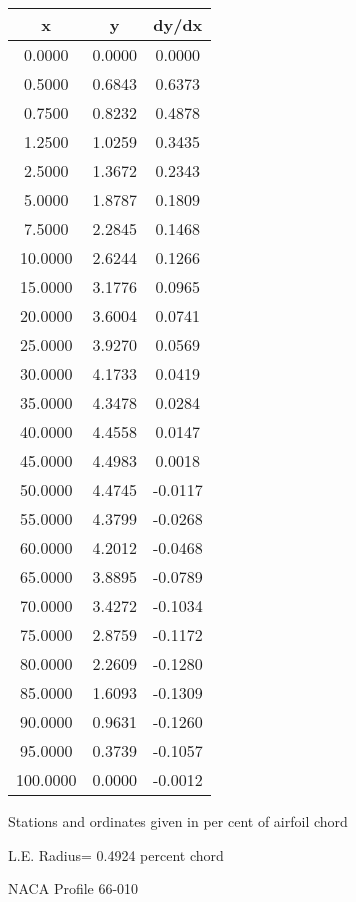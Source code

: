 \documentclass[11pt]{book}
\begin{document}
 \vspace{8mm}
 \begin{tabular}{|c|c|c|} \hline 
  x  &  y  &  dy/dx \\
 \hline
0.0000 & 0.0000 & 0.0000 \\
0.5000 & 0.6843 & 0.6373 \\
0.7500 & 0.8232 & 0.4878 \\
1.2500 & 1.0259 & 0.3435 \\
2.5000 & 1.3672 & 0.2343 \\
5.0000 & 1.8787 & 0.1809 \\
7.5000 & 2.2845 & 0.1468 \\
10.0000 & 2.6244 & 0.1266 \\
15.0000 & 3.1776 & 0.0965 \\
20.0000 & 3.6004 & 0.0741 \\
25.0000 & 3.9270 & 0.0569 \\
30.0000 & 4.1733 & 0.0419 \\
35.0000 & 4.3478 & 0.0284 \\
40.0000 & 4.4558 & 0.0147 \\
45.0000 & 4.4983 & 0.0018 \\
50.0000 & 4.4745 & -0.0117 \\
55.0000 & 4.3799 & -0.0268 \\
60.0000 & 4.2012 & -0.0468 \\
65.0000 & 3.8895 & -0.0789 \\
70.0000 & 3.4272 & -0.1034 \\
75.0000 & 2.8759 & -0.1172 \\
80.0000 & 2.2609 & -0.1280 \\
85.0000 & 1.6093 & -0.1309 \\
90.0000 & 0.9631 & -0.1260 \\
95.0000 & 0.3739 & -0.1057 \\
100.0000 & 0.0000 & -0.0012 \\
 \hline
 \end{tabular}
 \vspace{8mm}


Stations and ordinates given in per cent of airfoil chord 


L.E. Radius=  0.4924 percent chord
 \newpage
  \label{p66-010}
 \begin{Large}
 NACA Profile 66-010
 \end{Large}
  
\end{document}
